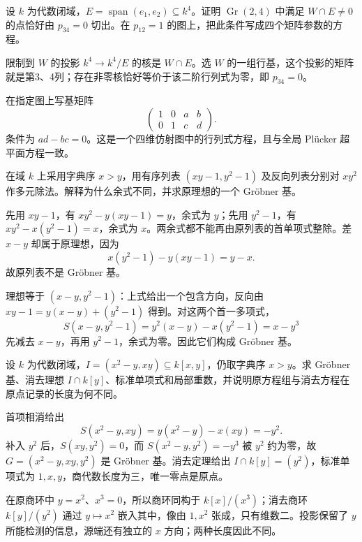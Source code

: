\begin{exercise}\label{g5:ex:grassmann-incidence}
	设 \(k\) 为代数闭域，\(E=\operatorname{span}(e_1,e_2)\subseteq k^4\)。证明 \(\operatorname{Gr}(2,4)\) 中满足 \(W\cap E\ne0\) 的点恰好由 \(p_{34}=0\) 切出。在 \(p_{12}=1\) 的图上，把此条件写成四个矩阵参数的方程。
\end{exercise}
\begin{solution}
	限制到 \(W\) 的投影 \(k^4\rightarrow k^4/E\) 的核是 \(W\cap E\)。选 \(W\) 的一组行基，这个投影的矩阵就是第3、4列；存在非零核恰好等价于该二阶行列式为零，即 \(p_{34}=0\)。

	在指定图上写基矩阵
	\[
		\begin{pmatrix}1&0&a&b\\0&1&c&d\end{pmatrix}.
	\]
	条件为 \(ad-bc=0\)。这是一个四维仿射图中的行列式方程，且与全局 Plücker 超平面方程一致。
\end{solution}

\begin{exercise}\label{g5:ex:division-order}
	在域 \(k\) 上采用字典序 \(x>y\)，用有序列表 \((xy-1,y^2-1)\) 及反向列表分别对 \(xy^2\) 作多元除法。解释为什么余式不同，并求原理想的一个 Gröbner 基。
\end{exercise}
\begin{solution}
	先用 \(xy-1\)，有 \(xy^2-y(xy-1)=y\)，余式为 \(y\)；先用 \(y^2-1\)，有 \(xy^2-x(y^2-1)=x\)，余式为 \(x\)。两余式都不能再由原列表的首单项式整除。差 \(x-y\) 却属于原理想，因为
	\[
		x(y^2-1)-y(xy-1)=y-x.
	\]
	故原列表不是 Gröbner 基。

	理想等于 \((x-y,y^2-1)\)：上式给出一个包含方向，反向由 \(xy-1=y(x-y)+(y^2-1)\) 得到。对这两个首一多项式，
	\[
		S(x-y,y^2-1)=y^2(x-y)-x(y^2-1)=x-y^3
	\]
	先减去 \(x-y\)，再用 \(y^2-1\)，余式为零。因此它们构成 Gröbner 基。
\end{solution}

\begin{exercise}\label{g5:ex:groebner-triple-point}
	设 \(k\) 为代数闭域，\(I=(x^2-y,xy)\subseteq k[x,y]\)，仍取字典序 \(x>y\)。求 Gröbner 基、消去理想 \(I\cap k[y]\)、标准单项式和局部重数，并说明原方程组与消去方程在原点记录的长度为何不同。
\end{exercise}
\begin{solution}
	首项相消给出
	\[
		S(x^2-y,xy)=y(x^2-y)-x(xy)=-y^2.
	\]
	补入 \(y^2\) 后，\(S(xy,y^2)=0\)，而
	\(S(x^2-y,y^2)=-y^3\) 被 \(y^2\) 约为零，故
	\(G=(x^2-y,xy,y^2)\) 是 Gröbner 基。消去定理给出
	\(I\cap k[y]=(y^2)\)，标准单项式为 \(1,x,y\)，商代数长度为三，唯一零点是原点。

	在原商环中 \(y=x^2\)、\(x^3=0\)，所以商环同构于 \(k[x]/(x^3)\)；消去商环 \(k[y]/(y^2)\) 通过 \(y\mapsto x^2\) 嵌入其中，像由 \(1,x^2\) 张成，只有维数二。投影保留了 \(y\) 所能检测的信息，源端还有独立的 \(x\) 方向；两种长度因此不同。
\end{solution}

